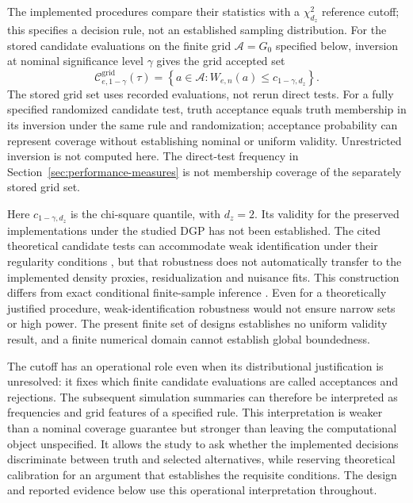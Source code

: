 The implemented procedures compare their statistics with a $\chi^2_{d_z}$ reference cutoff; this specifies a decision rule, not an established sampling distribution. For the stored candidate evaluations on the finite grid $\mathcal A=G_0$ specified below, inversion at nominal significance level $\gamma$ gives the grid accepted set
\begin{equation}
    \mathcal C^{\mathrm{grid}}_{e,1-\gamma}(\tau)
    =
    \left\{
        a\in\mathcal A:
        W_{e,n}(a)\leq c_{1-\gamma,d_z}
    \right\}.
    \label{eq:robust-confidence-region}
\end{equation}
The stored grid set uses recorded evaluations, not rerun direct tests. For a fully specified randomized candidate test, truth acceptance equals truth membership in its inversion under the same rule and randomization; acceptance probability can represent coverage without establishing nominal or uniform validity. Unrestricted inversion is not computed here. The direct-test frequency in Section~\ref{sec:performance-measures} is not membership coverage of the separately stored grid set.

Here $c_{1-\gamma,d_z}$ is the chi-square quantile, with $d_z=2$. Its validity for the preserved implementations under the studied DGP has not been established. The cited theoretical candidate tests can accommodate weak identification under their regularity conditions \parencite{chernozhukov_hansen_2008}, but that robustness does not automatically transfer to the implemented density proxies, residualization and nuisance fits. This construction differs from exact conditional finite-sample inference \parencite{chernozhukov_hansen_jansson_2009}. Even for a theoretically justified procedure, weak-identification robustness would not ensure narrow sets or high power. The present finite set of designs establishes no uniform validity result, and a finite numerical domain cannot establish global boundedness.

The cutoff has an operational role even when its distributional justification is unresolved: it fixes which finite candidate evaluations are called acceptances and rejections. The subsequent simulation summaries can therefore be interpreted as frequencies and grid features of a specified rule. This interpretation is weaker than a nominal coverage guarantee but stronger than leaving the computational object unspecified. It allows the study to ask whether the implemented decisions discriminate between truth and selected alternatives, while reserving theoretical calibration for an argument that establishes the requisite conditions. The design and reported evidence below use this operational interpretation throughout.
